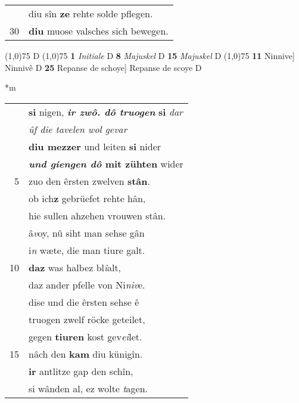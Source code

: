 \documentclass[8pt,a4paper,notitlepage]{article}
\begin{document}
\begin{table}[ht]
\begin{minipage}[t]{0.5\linewidth}
\begin{tabular}{rl}
 & diu sîn \textbf{ze} rehte solde pflegen.\\ 
30 & \textbf{diu} muose valsches sich bewegen.\\ 
\end{tabular}
\scriptsize
\line(1,0){75} \newline
D \newline
\line(1,0){75} \newline
\textbf{1} \textit{Initiale} D  \textbf{8} \textit{Majuskel} D  \textbf{15} \textit{Majuskel} D  \newline
\line(1,0){75} \newline
\textbf{11} Ninnive] Ninnivê D \textbf{25} Repanse de schoye] Repanse de scoye D \newline
\end{minipage}
\hspace{0.5cm}
\begin{minipage}[t]{0.5\linewidth}
\small
\begin{center}*m
\end{center}
\begin{tabular}{rl}
 & \textbf{si} nigen, \textit{\textbf{ir zwô. dô truogen}} \textbf{si} \textit{dar}\\ 
 & \textit{ûf die tavelen wol gevar}\\ 
 & \textbf{diu mezzer} und leiten \textbf{si} nider\\ 
 & \textbf{\textit{und giengen dô} mit zühten} wider\\ 
5 & zuo den êrsten zwelven \textbf{stân}.\\ 
 & ob ich\textbf{z} gebrüefet rehte hân,\\ 
 & hie sullen ahzehen vrouwen stân.\\ 
 & â\textit{v}oy, nû siht man sehse gân\\ 
 & i\textit{n} wæte, die man tiure galt.\\ 
10 & \textbf{daz} was halbez bl\textit{î}alt,\\ 
 & daz ander pfelle von Ni\textit{niv}e.\\ 
 & dise und die êrsten sehse ê\\ 
 & truogen zwelf röcke geteilet,\\ 
 & gegen \textbf{tiuren} kost gev\textit{ei}let.\\ 
15 & nâch den \textbf{kam} diu künigîn.\\ 
 & \textbf{ir} antlitze gap den schîn,\\ 
 & si wânden al, ez wolte \textit{t}agen.\\ 

\end{tabular}
\end{minipage}
\end{table}
\end{document}
